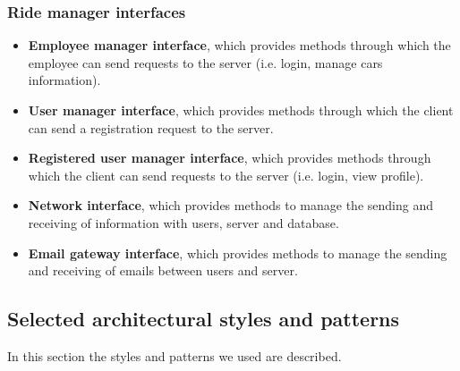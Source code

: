 \subsubsection{Ride manager interfaces}
\begin{itemize}
	\item \textbf{Employee manager interface}, which provides methods through which the employee can send requests to the server (i.e. login, manage cars information).
	\item \textbf{User manager interface}, which provides methods through which the client can send a registration request to the server.
	\item \textbf{Registered user manager interface}, which provides methods through which the client can send requests to the server (i.e. login, view profile).
	\item \textbf{Network interface}, which provides methods to manage the sending and receiving of information with users, server and database.
	\item \textbf{Email gateway interface}, which provides methods to manage the sending and receiving of emails between users and server.
\end{itemize}
\newpage
\subsection{Selected  architectural  styles  and  patterns}
In this section the styles and patterns we used are described.
